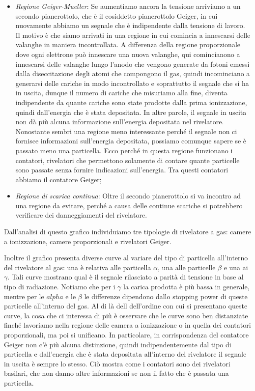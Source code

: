 \begin{itemize}[leftmargin=0.5cm]
   \item \textit{Regione Geiger-Mueller}: Se aumentiamo ancora la tensione arriviamo a un secondo pianerottolo, che è il cosiddetto pianerottolo Geiger, in cui nuovamente abbiamo un segnale che è indipendente dalla tensione di lavoro. Il motivo è che siamo arrivati in una regione in cui comincia a innescarsi delle valanghe in maniera incontrollata. A differenza della regione proporzionale dove ogni elettrone può innescare una nuova valanghe, qui comincianono a innescarsi delle valanghe lungo l'anodo che vengono generate da fotoni emessi dalla diseccitazione degli atomi che compongono il gas, quindi incominciano a generarsi delle cariche in modo incontrollato e soprattutto il segnale che si ha in uscita, dunque il numero di cariche che misuriamo alla fine, diventa indipendente da quante cariche sono state prodotte dalla prima ionizzazione, quindi dall'energia che è stata depositata. In altre parole, il segnale in uscita non dà più alcuna informazione sull'energia depositata nel rivelatore. Nonostante sembri una regione meno interessante perché il segnale non ci fornisce informazioni sull'energia depositata, possiamo comunque sapere se è passato meno una particella. Ecco perché in questa regione funzionano i contatori, rivelatori che permettono solamente di contare quante particelle sono passate senza fornire indicazioni sull'energia. Tra questi contatori abbiamo il contatore Geiger;
   \item \textit{Regione di scarica continua}: Oltre il secondo pianerottolo si va incontro ad una regione da evitare, perché a causa delle continue scariche si potrebbero verificare dei danneggiamenti del rivelatore.
\end{itemize}

Dall'analisi di questo grafico individuiamo tre tipologie di rivelatore a gas: camere a ionizzazione, camere proporzionali e rivelatori Geiger.

Inoltre il grafico presenta diverse curve al variare del tipo di particella all'interno del rivelatore al gas: una è relativa alle particella $\alpha$, una alle particelle $\beta$ e una ai $\gamma$. Tali curve mostrano qual è il segnale rilasciato a parità di tensione in base al tipo di radiazione. Notiamo che per i $\gamma$ la carica prodotta è più bassa in generale, mentre per le $alpha$ e le $\beta$ le differenze dipendono dallo stopping power di queste particelle all'interno del gas. Al di là dell dell'ordine con cui si presentano queste curve, la cosa che ci interessa di più è osservare che le curve sono ben distanziate finché lavoriamo nella regione delle camera a ionizzazione o in quella dei contatori proporzionali, ma poi si unificano. In particolare, in corrispondenza del contatore Geiger non c'è più alcuna distinzione, quindi indipendentemente dal tipo di particella e dall'energia che è stata depositata all'interno del rivelatore il segnale in uscita è sempre lo stesso. Ciò mostra come i contatori sono dei rivelatori basilari, che non danno altre informazioni se non il fatto che è passata una particella.


